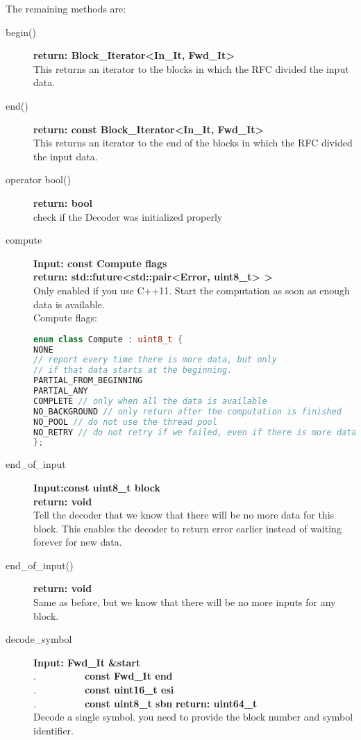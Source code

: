\documentclass[11pt,a4paper]{refart}
\begin{document}
The remaining methods are:
\begin{description}
\item[begin()] \textbf{return: Block\_Iterator<In\_It, Fwd\_It>}\\
This returns an iterator to the blocks in which the RFC divided the input data.
\item[end()] \textbf{return: const Block\_Iterator<In\_It, Fwd\_It>}\\
This returns an iterator to the end of the blocks in which the RFC divided the input data.
\item[operator bool()] \textbf{return: bool}\\
check if the Decoder was initialized properly

\item[compute] \textbf{Input: const Compute flags}\\
\textbf{return: std::future<std::pair<Error, uint8\_t> >}\\
Only enabled if you use C++11. Start the computation as soon as enough data is available.\\
Compute flags:
\begin{lstlisting}[language=C++]
enum class Compute : uint8_t {
NONE 
// report every time there is more data, but only
// if that data starts at the beginning.
PARTIAL_FROM_BEGINNING
PARTIAL_ANY
COMPLETE // only when all the data is available
NO_BACKGROUND // only return after the computation is finished
NO_POOL // do not use the thread pool
NO_RETRY // do not retry if we failed, even if there is more data
};
\end{lstlisting}

\item[end\_of\_input] \textbf{Input:const uint8\_t block}\\
\textbf{return: void}\\
Tell the decoder that we know that there will be no more data for this block. This enables the decoder to return error earlier instead of waiting forever for new data.
\item[end\_of\_input()] \textbf{return: void}\\
Same as before, but we know that there will be no more inputs for any block.


\item[decode\_symbol]\textbf{Input: Fwd\_It \&start}\\
.\ \ \ \ \ \ \ \ \ \ \textbf{const Fwd\_It end}\\
.\ \ \ \ \ \ \ \ \ \ \textbf{const uint16\_t esi}\\
.\ \ \ \ \ \ \ \ \ \ \textbf{const uint8\_t sbn}
\textbf{return: uint64\_t}\\
Decode a single symbol. you need to provide the block number and symbol identifier.


\end{description}
\end{document}
